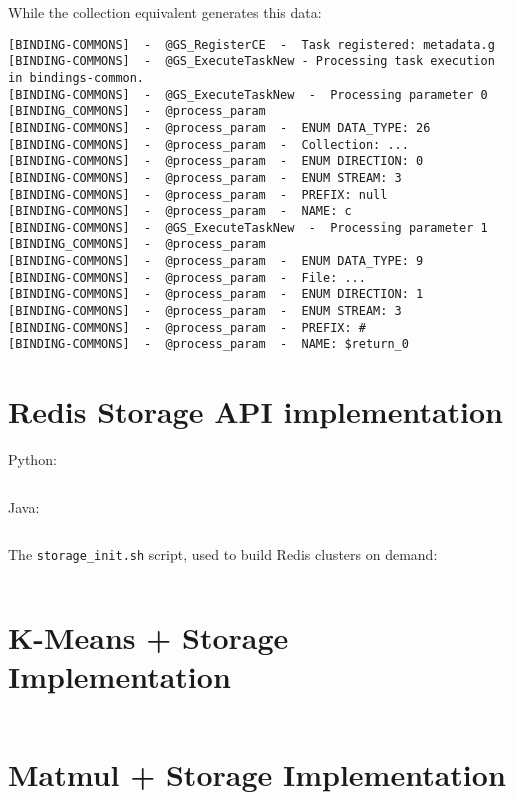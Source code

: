 While the collection equivalent generates this data:

\begin{verbatim}
[BINDING-COMMONS]  -  @GS_RegisterCE  -  Task registered: metadata.g
[BINDING-COMMONS]  -  @GS_ExecuteTaskNew - Processing task execution in bindings-common. 
[BINDING-COMMONS]  -  @GS_ExecuteTaskNew  -  Processing parameter 0
[BINDING_COMMONS]  -  @process_param
[BINDING-COMMONS]  -  @process_param  -  ENUM DATA_TYPE: 26
[BINDING-COMMONS]  -  @process_param  -  Collection: ...
[BINDING-COMMONS]  -  @process_param  -  ENUM DIRECTION: 0
[BINDING-COMMONS]  -  @process_param  -  ENUM STREAM: 3
[BINDING-COMMONS]  -  @process_param  -  PREFIX: null
[BINDING-COMMONS]  -  @process_param  -  NAME: c
[BINDING-COMMONS]  -  @GS_ExecuteTaskNew  -  Processing parameter 1
[BINDING_COMMONS]  -  @process_param
[BINDING-COMMONS]  -  @process_param  -  ENUM DATA_TYPE: 9
[BINDING-COMMONS]  -  @process_param  -  File: ...
[BINDING-COMMONS]  -  @process_param  -  ENUM DIRECTION: 1
[BINDING-COMMONS]  -  @process_param  -  ENUM STREAM: 3
[BINDING-COMMONS]  -  @process_param  -  PREFIX: #
[BINDING-COMMONS]  -  @process_param  -  NAME: $return_0
\end{verbatim}

\chapter{Redis Storage API implementation}
\label{subsec:storage_api_redis_impl}
Python:
\inputminted[breaklines = true]{python}{applications/STORAGE/redisPSCO/COMPSs-Redis-bundle/python/storage/api.py}
Java:
\inputminted[breaklines = true]{java}{applications/STORAGE/redisPSCO/src/main/java/storage/StorageItf.java}
The \verb|storage_init.sh| script, used to build Redis clusters on demand:
\inputminted[breaklines = true]{bash}{applications/STORAGE/redisPSCO/scripts/storage_init.sh}

\chapter{K-Means + Storage Implementation}
\label{subsec:kmeans_redis}
\inputminted[breaklines = true]{python}{snippets/kmeans_storage.py}


\chapter{Matmul + Storage Implementation}
\label{subsec:matmul_redis}
\inputminted[breaklines = true]{python}{snippets/matmul_storage.py}